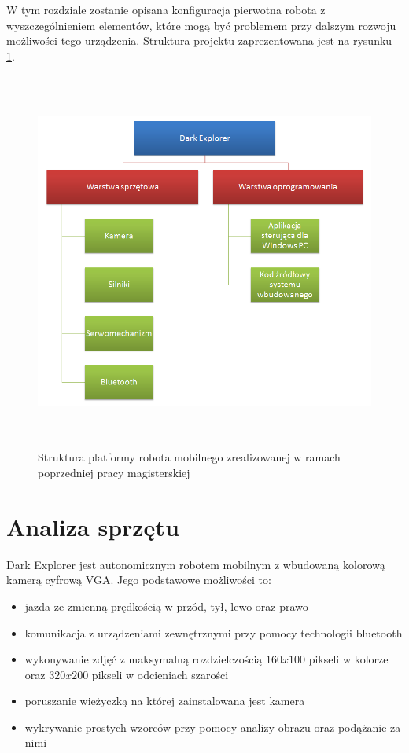 W tym rozdziale zostanie opisana konfiguracja pierwotna robota z
wyszczególnieniem elementów, które mogą być problemem przy dalszym rozwoju
możliwości tego urządzenia.  Struktura projektu zaprezentowana jest na rysunku
\ref{fig:KmakPlatform}.

\begin{figure}[!ht]
 \centering \includegraphics[height=125mm]{../images/ch02/kmak_platform.png}
 \caption{Struktura platformy robota mobilnego zrealizowanej w ramach poprzedniej
 pracy magisterskiej\cite{KmakMScThesis2009}}
 \label{fig:KmakPlatform}
\end{figure}

\section{Analiza sprzętu}
Dark Explorer jest autonomicznym robotem mobilnym z wbudowaną kolorową kamerą
cyfrową VGA. Jego podstawowe możliwości to:
\begin{itemize}
 \item jazda ze zmienną prędkością w przód, tył, lewo oraz prawo
 \item komunikacja z urządzeniami zewnętrznymi przy pomocy technologii bluetooth
 \item wykonywanie zdjęć z maksymalną rozdzielczością $160x100$ pikseli w kolorze oraz $320x200$ pikseli w odcieniach szarości
 \item poruszanie wieżyczką na której zainstalowana jest kamera
 \item wykrywanie prostych wzorców przy pomocy analizy obrazu oraz podążanie za nimi
\end{itemize}

